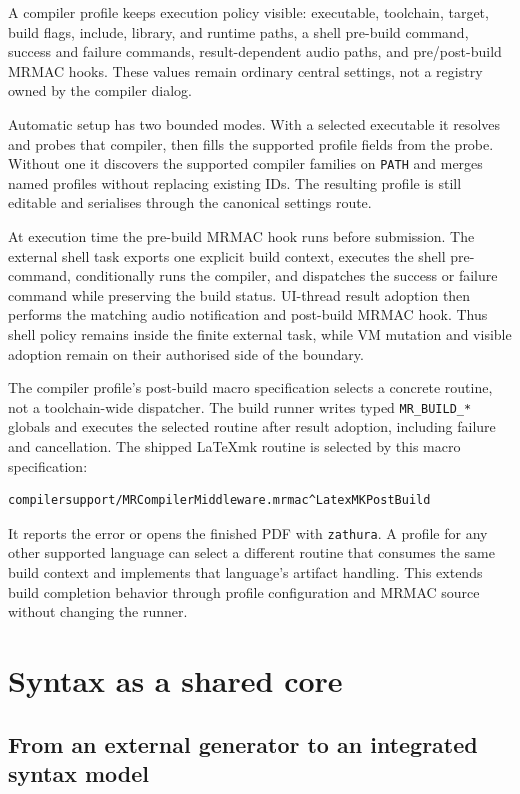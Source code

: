 \documentclass[a4paper,10pt,twoside,openany]{book}
\newcommand{\mrmac}{\textsc{MRMAC}}
\begin{document}
A compiler profile keeps execution policy visible: executable, toolchain,
target, build flags, include, library, and runtime paths, a shell pre-build
command, success and failure commands, result-dependent audio paths, and
pre/post-build \mrmac{} hooks. These values remain ordinary central settings,
not a registry owned by the compiler dialog.

Automatic setup has two bounded modes. With a selected executable it resolves
and probes that compiler, then fills the supported profile fields from the
probe. Without one it discovers the supported compiler families on
\texttt{PATH} and merges named profiles without replacing existing IDs.
The resulting profile is still editable and serialises through the canonical
settings route.

At execution time the pre-build \mrmac{} hook runs before submission. The
external shell task exports one explicit build context, executes the shell
pre-command, conditionally runs the compiler, and dispatches the success or
failure command while preserving the build status. UI-thread result adoption
then performs the matching audio notification and post-build \mrmac{} hook.
Thus shell policy remains inside the finite external task, while VM mutation
and visible adoption remain on their authorised side of the boundary.

The compiler profile's post-build macro specification selects a concrete
routine, not a toolchain-wide dispatcher. The build runner writes typed
\texttt{MR\_BUILD\_*} globals and executes the selected routine after result
adoption, including failure and cancellation. The shipped
LaTeXmk routine is selected by this macro specification:
\begin{verbatim}
compilersupport/MRCompilerMiddleware.mrmac^LatexMKPostBuild
\end{verbatim}
It reports the error or opens the finished PDF with
\texttt{zathura}. A profile for any other supported language can select a
different routine that consumes the same build context and implements that
language's artifact handling. This extends build completion behavior through
profile configuration and MRMAC source without changing the runner.

\part{Syntax as a shared core}

\chapter{From an external generator to an integrated syntax model}
\end{document}
